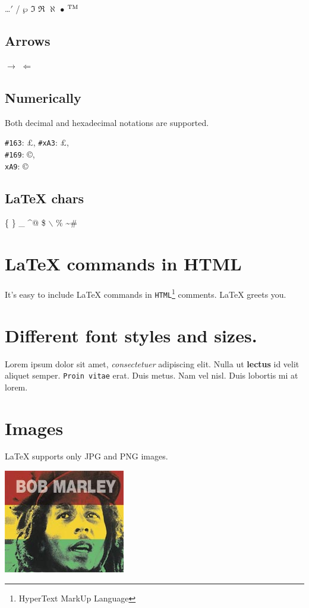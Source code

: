 \documentclass[a4paper,11pt]{article}
\begin{document}
\ldots $\prime$ / $\wp$ $\Im$ $\Re$ $\aleph$ $\bullet$ $^{\rm TM}$

\subsection{Arrows}

$\rightarrow$ $\Leftarrow$

\subsection{Numerically}

Both decimal and hexadecimal notations are supported.

\texttt{\#163}: \pounds, \texttt{\#xA3}: \pounds, 
\\\texttt{\#169}: \copyright, 
\\\texttt{xA9}: \copyright   

\subsection{LaTeX chars}

\{ \} \_ \textasciicircum @ \$ $\backslash$ \% \textasciitilde \#

\section{LaTeX commands in HTML}

It's easy to include LaTeX commands in \texttt{HTML}\footnote{HyperText MarkUp Language} comments.   
\LaTeX{} greets you.


\section{Different font styles and sizes.}

Lorem ipsum {\Huge dolor} sit amet, \textit{consectetuer} adipiscing elit.  Nulla ut \textbf{lectus} id velit aliquet semper. \texttt{Proin vitae} erat. Duis metus. Nam  vel nisl. Duis \scriptsize lobortis \normalsize mi at {\tiny lorem}.\hypertarget{img}{}

\section{Images}

 \LaTeX
 supports only JPG and PNG images.


\begin{center}

\includegraphics{marley.jpg}
\end{center}
\end{document}
